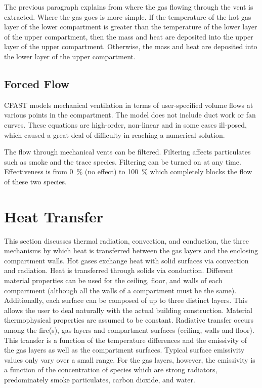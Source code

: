 \documentclass[12pt,twoside]{book}
\begin{document}
The previous paragraph explains from where the gas flowing through the vent is extracted. Where the gas goes is more simple. If the temperature of the hot gas layer of the lower compartment is greater than the temperature of the lower layer of the upper compartment, then the mass and heat are deposited into the upper layer of the upper compartment. Otherwise, the mass and heat are deposited into the lower layer of the upper compartment.


\section{Forced Flow}

CFAST models mechanical ventilation in terms of user-specified volume flows at various points in the compartment. The model does not include duct work or fan curves. These equations are high-order, non-linear and in some cases ill-posed, which caused a great deal of difficulty in reaching a numerical solution.

The flow through mechanical vents can be filtered. Filtering affects particulates such as smoke and the trace species. Filtering can be turned on at any time. Effectiveness is from 0~\% (no effect) to 100~\% which completely blocks the flow of these two species.

%
%

\chapter{Heat Transfer}

This section discusses thermal radiation, convection, and conduction, the three mechanisms by which heat is transferred between the gas layers and the enclosing compartment walls. Hot gases exchange heat with solid surfaces via convection and radiation. Heat is transferred through solids via conduction. Different material properties can be used for the ceiling, floor, and walls of each compartment (although all the walls of a compartment must be the same).  Additionally, each surface can be composed of up to three distinct layers.  This allows the user to deal naturally with the actual building construction.  Material thermophysical properties are assumed to be constant. Radiative transfer occurs among the fire(s), gas layers and compartment surfaces (ceiling, walls and floor).  This transfer is a function of the temperature differences and the emissivity of the gas layers as well as the compartment surfaces.  Typical surface emissivity values only vary over a small range.  For the gas layers, however, the emissivity is a function of the concentration of species which are strong radiators, predominately smoke particulates, carbon dioxide, and water.
\end{document}
